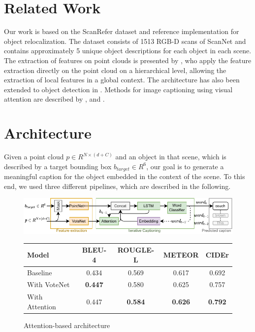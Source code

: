 \documentclass[10pt,twocolumn,letterpaper]{article}
\begin{document}
\section{Related Work}
Our work is based on the ScanRefer \cite{chen2019scanrefer} dataset and reference implementation for object relocalization. The dataset consists of 1513 RGB-D scans of ScanNet \cite{dai2017scannet} and contains approximately 5 unique object descriptions for each object in each scene. The extraction of features on point clouds is presented by \cite{qi2017pointnet++}, who apply the feature extraction directly on the point cloud on a hierarchical level, allowing the extraction of local features in a global context. The architecture has also been extended to object detection in \cite{qi2019deep}. Methods for image captioning using visual attention are described by \cite{xu2015show}, \cite{lu2017knowing} and \cite{anderson2018bottom}.

\section{Architecture}

Given a point cloud $\mathit{p \in R^{N\times(d+C)}}$ and an object in that scene, which is described by a target bounding box $b_{target}\in R^6$, our goal is to generate a meaningful caption for the object embedded in the context of the scene. To this end, we used three different pipelines, which are described in the following.

\begin{figure}	
	\centering
	\begin{minipage}[b]{.55\textwidth}
		\includegraphics[width=.95\textwidth]{figures/arch_condensed_2.pdf}
		\caption{Attention-based architecture}
		\label{fig:arch}
	\end{minipage}
	\begin{minipage}[b]{.44\textwidth}
		{\scriptsize 
			\begin{tabular}{|l|cccc|}
			\hline
			\textbf{Model} & \textbf{BLEU-4} & \textbf{ROUGLE-L} & \textbf{METEOR} & \textbf{CIDEr}\\
			\hline
			Baseline & 0.434 & 0.569 & 0.617 & 0.692 \\
			With VoteNet & \textbf{0.447} & 0.580 & 0.625 & 0.757 \\
			With Attention & 0.447 & \textbf{0.584} & \textbf{0.626} & \textbf{0.792} \\
			\hline
		\end{tabular}}
		\vspace{.5\baselineskip}
		\label{tab:quantitative_results}
	\end{minipage}
\end{figure}
\end{document}
